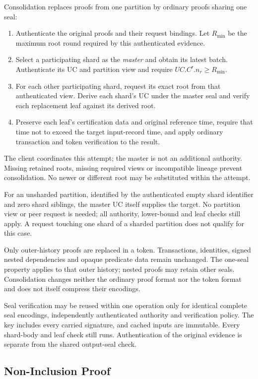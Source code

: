 Consolidation replaces proofs from one partition by ordinary proofs sharing one seal:
\begin{enumerate}
\item Authenticate the original proofs and their request bindings. Let $R_{\min}$ be the maximum root round required by this authenticated evidence.
\item Select a participating shard as the \emph{master} and obtain its latest batch. Authenticate its UC and partition view and require $UC.C^\mathsf{r}.n_r\ge R_{\min}$.
\item For each other participating shard, request its exact root from that authenticated view. Derive each shard's UC under the master seal and verify each replacement leaf against its derived root.
\item Preserve each leaf's certification data and original reference time, require that time not to exceed the target input-record time, and apply ordinary transaction and token verification to the result.
\end{enumerate}
The client coordinates this attempt; the master is not an additional authority. Missing retained roots, missing required views or incompatible lineage prevent consolidation. No newer or different root may be substituted within the attempt.

For an unsharded partition, identified by the authenticated empty shard identifier and zero shard siblings, the master UC itself supplies the target. No partition view or peer request is needed; all authority, lower-bound and leaf checks still apply. A request touching one shard of a sharded partition does not qualify for this case.

Only outer-history proofs are replaced in a token. Transactions, identities, signed nested dependencies and opaque predicate data remain unchanged. The one-seal property applies to that outer history; nested proofs may retain other seals. Consolidation changes neither the ordinary proof format nor the token format and does not itself compress their encodings.

Seal verification may be reused within one operation only for identical complete seal encodings, independently authenticated authority and verification policy. The key includes every carried signature, and cached inputs are immutable. Every shard-body and leaf check still runs. Authentication of the original evidence is separate from the shared output-seal check.

\subsection{Non-Inclusion Proof}


